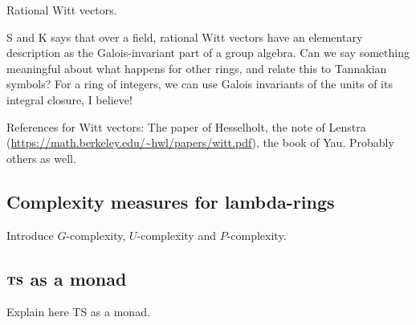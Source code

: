 \begin{example}
Rational Witt vectors.
\end{example}

S and K says that over a field, rational Witt vectors have an elementary description as the Galois-invariant part of a group algebra. Can we say something meaningful about what happens for other rings, and relate this to Tannakian symbols? For a ring of integers, we can use Galois invariants of the units of its integral closure, I believe!

References for Witt vectors:
The paper of Hesselholt, the note of Lenstra (\url{https://math.berkeley.edu/~hwl/papers/witt.pdf}), the book of Yau. Probably others as well.

\subsection{Complexity measures for lambda-rings}

Introduce $G$-complexity, $U$-complexity and $P$-complexity.



\subsection{$\mathbf{TS}$ as a monad}

Explain here TS as a monad.
